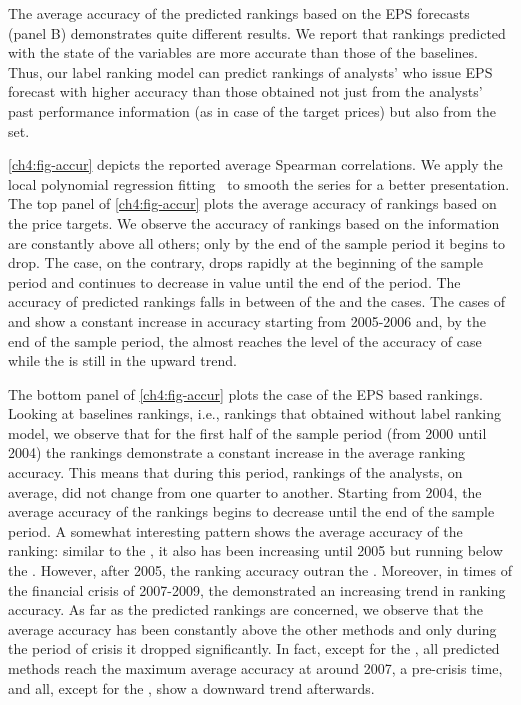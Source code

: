 \documentclass[12pt,a4paper]{article}\usepackage[]{graphicx}\usepackage[]{color}
\begin{document}
The average accuracy of the predicted rankings based on the EPS forecasts (panel B) demonstrates quite different results. We report that rankings predicted  with the \diff{} state of the variables are more accurate  than those of the baselines. Thus, our label ranking model can predict rankings of analysts' who issue EPS forecast with higher accuracy than those obtained not just from  the  analysts' past performance information (as in case of the target prices) but also from the \naive{} set.   

\ref{ch4:fig-accur} depicts the reported average Spearman correlations. We apply the local polynomial regression fitting~\citep{cleveland1992} to smooth the series for a better presentation. The top panel of \ref{ch4:fig-accur} plots the average accuracy of rankings based on the price targets. We observe the accuracy of rankings based on the \naive{} information are constantly above all others; only by the end of the sample period it begins to drop. The  case, on the contrary, drops rapidly at the beginning of the sample period and continues to decrease in value until the end of the period. The accuracy of predicted rankings falls in between of the \naive{} and the  cases. The cases of \diff{} and \random{} show a constant increase in accuracy starting from 2005-2006  and, by the end of the sample period, the \random{} almost reaches the level of the accuracy of \naive{} case while the \diff{} is still in the upward trend.

The bottom panel of \ref{ch4:fig-accur} plots the case of the EPS based rankings. Looking at baselines rankings, i.e., rankings that obtained without label ranking model, we observe that for the first half of the sample period (from 2000 until 2004) the \naive{} rankings  demonstrate a constant increase in the average ranking accuracy. This means that during this period, rankings of the analysts, on average, did not change from one quarter to another. Starting from 2004, the average accuracy of the \naive{} rankings begins to decrease until the end of the sample period. A somewhat interesting pattern shows the average accuracy of the  ranking: similar to the \naive{}, it also has been increasing until 2005 but running below the \naive{}. However, after 2005, the  ranking accuracy outran the \naive{}. Moreover, in times of the financial crisis of 2007-2009, the  demonstrated an increasing trend in ranking accuracy. As far as the predicted rankings are concerned, we observe that the \diff{} average accuracy has been constantly above the other methods and only during the period of crisis it dropped significantly. In fact, except for the \random{}, all predicted methods reach the maximum average accuracy at around 2007, a pre-crisis time, and all, except for the , show a downward trend afterwards.
\end{document}
